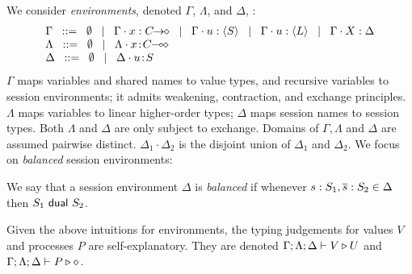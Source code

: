 \documentclass[runningheads]{llncs}
\begin{document}
{%
We consider 
\emph{environments}, denoted $\Gamma$, $\Lambda$, and $\Delta$, :
\[
	\begin{array}{l}
		\Gamma  \bnfis  \emptyset \bnfbar \Gamma \cat \varp{x}: \shot{C} \bnfbar \Gamma \cat u: \chtype{S} \bnfbar \Gamma \cat u: \chtype{L} 
		\bnfbar \Gamma \cat \rvar{X}: \Delta
\\
		\Lambda \bnfis  \emptyset \bnfbar \Lambda \cat \AT{x}{\lhot{C}}
		 \\
		\Delta   \bnfis   \emptyset \bnfbar \Delta \cat \AT{u}{S}
	\end{array}
\]
$\Gamma$ maps variables and shared names to value types, and recursive 
variables to session environments; %
it admits weakening, contraction, and exchange principles.
$\Lambda$ maps variables to 
linear
higher-order
types;   $\Delta$  maps   
session names to session types. 
Both $\Lambda$ and $\Delta$
are
only subject to exchange.  
Domains of $\Gamma,
\Lambda$ and $\Delta$ are assumed pairwise distinct. 
$\Delta_1\cdot \Delta_2$ is the disjoint union of $\Delta_1$ and $\Delta_2$.  
We focus on \emph{balanced} session environments: 


\begin{definition}[Balanced]\label{d:wtenv}%
	We say that a session environment $\Delta$ is {\em balanced} if whenever
	$s: S_1, \overline{s}: S_2 \in \Delta$ then $S_1 \ \mathsf{dual}\  S_2$.
\end{definition}

Given the above intuitions for environments, 
the typing judgements for values $V$ and processes $P$ are self-explanatory.
They are denoted 
$\Gamma; \Lambda; \Delta \vdash V \triangleright U$ and $\Gamma; \Lambda; \Delta \vdash P \triangleright \diamond$.
%
 
}
\end{document}
